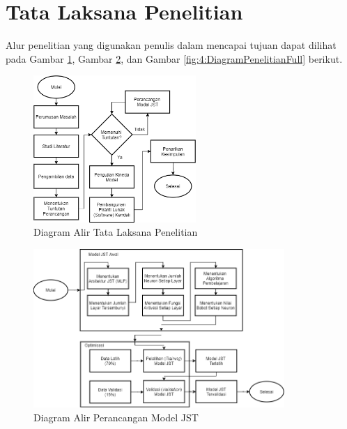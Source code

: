 \section{Tata Laksana Penelitian}
Alur penelitian yang digunakan penulis dalam mencapai tujuan dapat dilihat pada Gambar \ref{fig:4:TataLaksanaPenelitian}, Gambar \ref{fig:4:DiagramPerancanganModel}, dan Gambar \ref{fig:4:DiagramPenelitianFull} berikut.
\begin{figure}[!h]
	\centering
	\includegraphics[width=0.55\textwidth]{figures/AlurPenelitian}
	\caption{Diagram Alir Tata Laksana Penelitian}
	\label{fig:4:TataLaksanaPenelitian}
\end{figure}

\begin{figure}[!h]
	\centering
	\includegraphics[width=0.85\textwidth]{figures/PerancanganModel}
	\caption{Diagram Alir Perancangan Model JST}
	\label{fig:4:DiagramPerancanganModel}
\end{figure}

